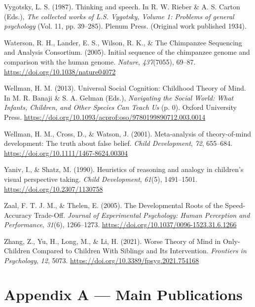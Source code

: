 \documentclass[
]{scrbook}
\newlength{\cslhangindent}
\newenvironment{CSLReferences}[2] %
 {\begin{list}{}{%
  \setlength{\itemindent}{0pt}
  \setlength{\leftmargin}{0pt}
  \setlength{\parsep}{0pt}
  \ifodd #1
   \setlength{\leftmargin}{\cslhangindent}
   \setlength{\itemindent}{-1\cslhangindent}
  \fi
  \setlength{\itemsep}{#2\baselineskip}}}
 {\end{list}}
\begin{document}
\begin{CSLReferences}{1}{0}
Vygotsky, L. S. (1987). Thinking and speech. In R. W. Rieber \& A. S. Carton (Eds.), \emph{The collected works of {L}.{S}. {Vygotsky}, {Volume} 1: {Problems} of general psychology} (Vol. 11, pp. 39--285). Plenum Press. (Original work published 1934).

Waterson, R. H., Lander, E. S., Wilson, R. K., \& The Chimpanzee Sequencing and Analysis Consortium. (2005). Initial sequence of the chimpanzee genome and comparison with the human genome. \emph{Nature}, \emph{437}(7055), 69--87. \url{https://doi.org/10.1038/nature04072}

Wellman, H. M. (2013). Universal {Social Cognition}: {Childhood Theory} of {Mind}. In M. R. Banaji \& S. A. Gelman (Eds.), \emph{Navigating the {Social World}: {What Infants}, {Children}, and {Other Species Can Teach Us}} (p. 0). Oxford University Press. \url{https://doi.org/10.1093/acprof:oso/9780199890712.003.0014}

Wellman, H. M., Cross, D., \& Watson, J. (2001). Meta-analysis of theory-of-mind development: {The} truth about false belief. \emph{Child Development}, \emph{72}, 655--684. \url{https://doi.org/10.1111/1467-8624.00304}

Yaniv, I., \& Shatz, M. (1990). Heuristics of reasoning and analogy in children's visual perspective taking. \emph{Child Development}, \emph{61}(5), 1491--1501. \url{https://doi.org/10.2307/1130758}

Zaal, F. T. J. M., \& Thelen, E. (2005). The {Developmental Roots} of the {Speed-Accuracy Trade-Off}. \emph{Journal of Experimental Psychology: Human Perception and Performance}, \emph{31}(6), 1266--1273. \url{https://doi.org/10.1037/0096-1523.31.6.1266}

Zhang, Z., Yu, H., Long, M., \& Li, H. (2021). Worse {Theory} of {Mind} in {Only-Children Compared} to {Children With Siblings} and {Its Intervention}. \emph{Frontiers in Psychology}, \emph{12}, 5073. \url{https://doi.org/10.3389/fpsyg.2021.754168}

\end{CSLReferences}

\chapter{Appendix A --- Main Publications}\label{appendixA}
\end{document}
